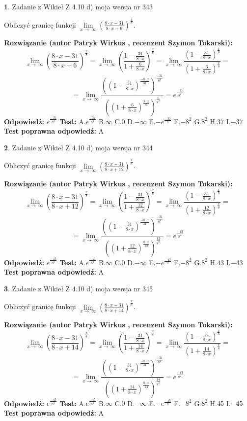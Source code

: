 \documentclass[12pt, a4paper]{article}
\theoremstyle{definition} %
\newtheorem{zad}{}
\newcommand{\zadStart}[1]{\begin{zad}#1\newline}
\newcommand{\zadStop}{\end{zad}}
\newcommand{\rozwStart}[2]{\noindent \textbf{Rozwiązanie (autor #1 , recenzent #2): }\newline}
\newcommand{\rozwStop}{\newline}
\newcommand{\odpStart}{\noindent \textbf{Odpowiedź:}\newline}
\newcommand{\odpStop}{\newline}
\newcommand{\testStart}{\noindent \textbf{Test:}\newline}
\newcommand{\testStop}{\newline}
\newcommand{\kluczStart}{\noindent \textbf{Test poprawna odpowiedź:}\newline}
\newcommand{\kluczStop}{\newline}
\begin{document}
\zadStart{Zadanie z Wikieł Z 4.10 d) moja wersja nr 343}


Obliczyć granicę funkcji  $\lim\limits_{x\to\ \infty}(\frac{8\cdot x-31}{8\cdot x+6})^{\frac{x}{8}}$.
\zadStop
\rozwStart{Patryk Wirkus}{Szymon Tokarski}
$$\lim\limits_{x\to\ \infty}(\frac{8\cdot x-31}{8\cdot x+6})^{\frac{x}{8}} = \lim\limits_{x\to\ \infty}(\frac{1-\frac{31}{8\cdot x}}{1+\frac{6}{8\cdot x}})^{\frac{x}{8}}=\lim\limits_{x\to\ \infty}\frac{(1-\frac{31}{8\cdot x})^{\frac{x}{8}}}{(1+\frac{6}{8\cdot x})^{\frac{x}{8}}}=$$
$$=\lim\limits_{x\to\ \infty}\frac{((1-\frac{31}{8\cdot x})^{\frac{-8\cdot x}{31}})^{\frac{-31}{8^{2}}}}{((1+\frac{6}{8\cdot x})^{\frac{8\cdot x}{6}})^{\frac{6}{8^{2}}}}=e^{\frac{-37}{8^{2}}}$$
\rozwStop
\odpStart
$e^{\frac{-37}{8^{2}}}$
\odpStop
\testStart
A.$e^{\frac{-37}{8^{2}}}$ B.$\infty$ C.$0$ D.$-\infty$ E.$-e^{\frac{-37}{8}}$
F.$-8^{2}$ G.$8^{2}$
H.$37$
I.$-37$
\testStop
\kluczStart
A
\kluczStop



\zadStart{Zadanie z Wikieł Z 4.10 d) moja wersja nr 344}


Obliczyć granicę funkcji  $\lim\limits_{x\to\ \infty}(\frac{8\cdot x-31}{8\cdot x+12})^{\frac{x}{8}}$.
\zadStop
\rozwStart{Patryk Wirkus}{Szymon Tokarski}
$$\lim\limits_{x\to\ \infty}(\frac{8\cdot x-31}{8\cdot x+12})^{\frac{x}{8}} = \lim\limits_{x\to\ \infty}(\frac{1-\frac{31}{8\cdot x}}{1+\frac{12}{8\cdot x}})^{\frac{x}{8}}=\lim\limits_{x\to\ \infty}\frac{(1-\frac{31}{8\cdot x})^{\frac{x}{8}}}{(1+\frac{12}{8\cdot x})^{\frac{x}{8}}}=$$
$$=\lim\limits_{x\to\ \infty}\frac{((1-\frac{31}{8\cdot x})^{\frac{-8\cdot x}{31}})^{\frac{-31}{8^{2}}}}{((1+\frac{12}{8\cdot x})^{\frac{8\cdot x}{12}})^{\frac{12}{8^{2}}}}=e^{\frac{-43}{8^{2}}}$$
\rozwStop
\odpStart
$e^{\frac{-43}{8^{2}}}$
\odpStop
\testStart
A.$e^{\frac{-43}{8^{2}}}$ B.$\infty$ C.$0$ D.$-\infty$ E.$-e^{\frac{-43}{8}}$
F.$-8^{2}$ G.$8^{2}$
H.$43$
I.$-43$
\testStop
\kluczStart
A
\kluczStop



\zadStart{Zadanie z Wikieł Z 4.10 d) moja wersja nr 345}


Obliczyć granicę funkcji  $\lim\limits_{x\to\ \infty}(\frac{8\cdot x-31}{8\cdot x+14})^{\frac{x}{8}}$.
\zadStop
\rozwStart{Patryk Wirkus}{Szymon Tokarski}
$$\lim\limits_{x\to\ \infty}(\frac{8\cdot x-31}{8\cdot x+14})^{\frac{x}{8}} = \lim\limits_{x\to\ \infty}(\frac{1-\frac{31}{8\cdot x}}{1+\frac{14}{8\cdot x}})^{\frac{x}{8}}=\lim\limits_{x\to\ \infty}\frac{(1-\frac{31}{8\cdot x})^{\frac{x}{8}}}{(1+\frac{14}{8\cdot x})^{\frac{x}{8}}}=$$
$$=\lim\limits_{x\to\ \infty}\frac{((1-\frac{31}{8\cdot x})^{\frac{-8\cdot x}{31}})^{\frac{-31}{8^{2}}}}{((1+\frac{14}{8\cdot x})^{\frac{8\cdot x}{14}})^{\frac{14}{8^{2}}}}=e^{\frac{-45}{8^{2}}}$$
\rozwStop
\odpStart
$e^{\frac{-45}{8^{2}}}$
\odpStop
\testStart
A.$e^{\frac{-45}{8^{2}}}$ B.$\infty$ C.$0$ D.$-\infty$ E.$-e^{\frac{-45}{8}}$
F.$-8^{2}$ G.$8^{2}$
H.$45$
I.$-45$
\testStop
\kluczStart
A
\kluczStop
\end{document}
